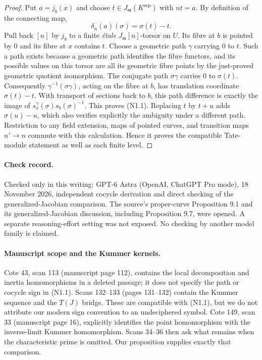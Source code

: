\begin{proof}
Put $a=j_b(x)$ and choose $t\in J_{\mathfrak m}(K^{\mathrm{sep}})$
with $nt=a$. By definition of the connecting map,
\[
               \delta_n(a)(\sigma)=\sigma(t)-t.           \tag{N1.3}
\]
Pull back $[n]$ by $j_b$ to a finite \emph{\'etale}
$J_{\mathfrak m}[n]$-torsor on $U$. Its fibre at $b$ is pointed
by $0$ and its fibre at $x$ contains $t$. Choose a geometric path
$\gamma$ carrying $0$ to $t$. Such a path exists because a
geometric path identifies the fibre functors, and its possible
values on this torsor are all its geometric fibre points by the
just-proved geometric quotient isomorphism. The conjugate path
$\sigma\gamma$ carries $0$ to $\sigma(t)$. Consequently
$\gamma^{-1}(\sigma\gamma)$, acting on the fibre at $b$, has
translation coordinate $\sigma(t)-t$. With transport of sections
back to $b$, this path difference is exactly the image of
$s_x^\gamma(\sigma)s_b(\sigma)^{-1}$. This proves (N1.1).
Replacing $t$ by $t+u$ adds $\sigma(u)-u$, which also verifies
explicitly the ambiguity under a different path. Restriction to
any field extension, maps of pointed curves, and transition maps
$n'\to n$ commute with this calculation. Hence it proves the
compatible Tate-module statement as well as each finite level.
\end{proof}

\paragraph{Check record.}
Checked only in this writing: GPT-6 Astra (OpenAI, ChatGPT Pro mode),
18 November 2026, independent cocycle derivation and direct checking
of the generalized-Jacobian comparison. The source's proper-curve
Proposition 9.1 and its generalized-Jacobian discussion, including
Proposition 9.7, were opened. A separate reasoning-effort setting
was not exposed. No checking by another model family is claimed.

\paragraph{Manuscript scope and the Kummer kernels.}
Cote 43, scan 113 (manuscript page 112), contains the local
decomposition and inertia homomorphisms in a deleted passage; it
does not specify the path or cocycle sign in (N1.1). Scans 132--133
(pages 131--132) contain the Kummer sequence and the $T(J)$ bridge.
These are compatible with (N1.1), but we do not attribute our
modern sign convention to an undeciphered symbol. Cote 149,
scan 33 (manuscript page 16), explicitly identifies the
point homomorphism with the inverse-limit Kummer homomorphism.
Scans 34--36 then ask what remains when the characteristic prime
is omitted. Our proposition supplies exactly that comparison.

